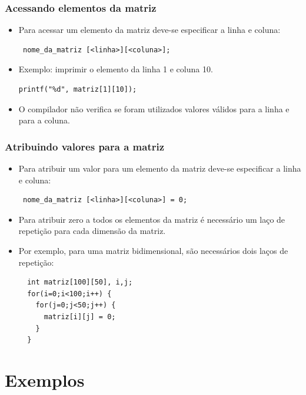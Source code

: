 \documentclass[aspectratio=169]{beamer}
\begin{document}

\begin{frame}[fragile]
\frametitle{Acessando elementos da matriz}
\begin{itemize}
\item Para acessar um elemento da matriz deve-se especificar a linha e coluna:
\begin{lstlisting}
 nome_da_matriz [<linha>][<coluna>];
\end{lstlisting}
\item Exemplo: imprimir o elemento da linha 1 e coluna 10.
\begin{lstlisting}
printf("%d", matriz[1][10]);
\end{lstlisting}
\item O compilador não verifica se foram utilizados valores válidos para a linha e para a coluna.
\end{itemize}
\end{frame}


\begin{frame}[fragile]
\frametitle{Atribuindo valores para a matriz}
\begin{itemize}
\item Para atribuir um valor para um elemento da matriz deve-se especificar a linha e coluna:
\begin{lstlisting}
 nome_da_matriz [<linha>][<coluna>] = 0;
\end{lstlisting}
\item Para atribuir zero a todos os elementos da matriz é necessário um laço de repetição para cada dimensão da matriz. 
\item Por exemplo, para uma matriz bidimensional, são necessários dois laços de repetição:
\begin{lstlisting}
  int matriz[100][50], i,j;
  for(i=0;i<100;i++) {
    for(j=0;j<50;j++) {
      matriz[i][j] = 0;
    }
  }
\end{lstlisting}
\end{itemize}
\end{frame}


\section{Exemplos}
\end{document}
